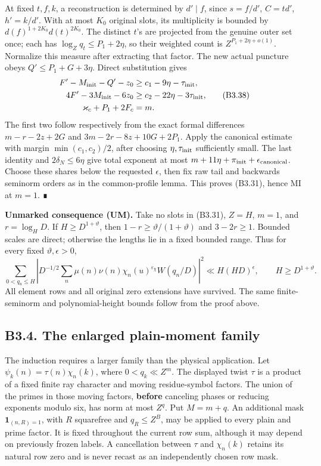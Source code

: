 \documentclass[11pt,a4paper]{article}
\begin{document}
At fixed \(t,\allowbreak{}f,\allowbreak{}k\), a reconstruction is determined by \(d'\mid f\),
since \(s=f/d'\), \(C=td'\), \(h'=k/d'\). With at most \(K_0\) original
slots, its multiplicity is bounded by \(d(f)^{1+2K_0}d(t)^{2K_0}\). The
distinct \(t\)'s are projected from the genuine outer set once; each has
\(\log_Zq_t\le P_1+2\eta\), so their weighted count is
\(Z^{P_1+2\eta+o(1)}\). Normalize this measure after extracting that
factor. The new actual puncture obeys \(Q'\le P_1+G+3\eta\). Direct
substitution gives \[
\begin{aligned}
F'-M_{\rm init}-Q'-z_0&\ge c_1-9\eta-\tau_{\rm init},\\
4F'-3M_{\rm init}-6z_0&\ge c_2-22\eta-3\tau_{\rm init},\\
\varkappa_c+P_1+2F_c&=m.
\end{aligned}\tag{B3.38}
\] The first two follow respectively from the exact formal differences
\(m-r-2z+2G\) and \(3m-2r-8z+10G+2P_1\). Apply the canonical estimate
with margin \(\min(c_1,\allowbreak{}c_2)/2\), after choosing \(\eta,\allowbreak{}\tau_{\rm init}\)
sufficiently small. The last identity and \(2\delta_N\le6\eta\) give
total exponent at most
\(m+11\eta+\pi_{\rm init}+\epsilon_{\rm canonical}\). Choose these
shares below the requested \(\epsilon\), then fix raw tail and backwards
seminorm orders as in the common-profile lemma. This proves (B3.31),
hence MI at \(m=1\). ∎

\textbf{Unmarked consequence (UM).} Take no slots in (B3.31), \(Z=H\),
\(m=1\), and \(r=\log_H D\). If \(H\ge D^{1+\vartheta}\), then
\(1-r\ge\vartheta/(1+\vartheta)\) and \(3-2r\ge1\). Bounded scales are
direct; otherwise the lengths lie in a fixed bounded range. Thus for
every fixed \(\vartheta,\allowbreak{}\epsilon>0\), \[
\sum_{0<q_u\le H}\left|D^{-1/2}\sum_n\mu(n)\nu(n)
 \chi_n(u)^{\varepsilon_\chi}W(q_n/D)\right|^2
\ll H(HD)^\epsilon,\qquad H\ge D^{1+\vartheta}.
\tag{B3.39}
\] All element rows and all original zero extensions have survived. The
same finite-seminorm and polynomial-height bounds follow from the proof
above.

\hypertarget{b3.4.-the-enlarged-plain-moment-family}{%
\subsection{B3.4. The enlarged plain-moment
family}\label{b3.4.-the-enlarged-plain-moment-family}}

The induction requires a larger family than the physical application.
Let \(\psi_k(n)=\tau(n)\chi_n(k)\), where \(0<q_k\ll Z^m\). The
displayed twist \(\tau\) is a product of a fixed finite ray character
and moving residue-symbol factors. The union of the primes in those
moving factors, \textbf{before} canceling phases or reducing exponents
modulo six, has norm at most \(Z^q\). Put \(M=m+q\). An additional mask
\(\mathbf1_{(n,\allowbreak{}R)=1}\), with \(R\) squarefree and \(q_R\le Z^B\), may be
applied to every plain and prime factor. It is fixed throughout the
current row sum, although it may depend on previously frozen labels. A
cancellation between \(\tau\) and \(\chi_n(k)\) retains its natural row
zero and is never recast as an independently chosen row mask.
\end{document}
